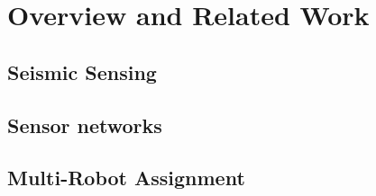 \section{Overview and Related Work}\label{sec:RelatedWork}
\subsection{Seismic Sensing}
\subsection{Sensor networks}
\subsection{Multi-Robot Assignment}